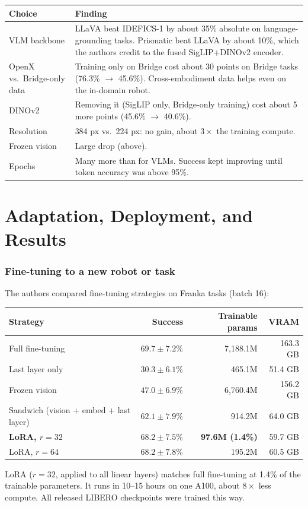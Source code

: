 \documentclass[11pt]{article}
\begin{document}
\begin{center}
\begin{tabularx}{\linewidth}{@{}lX@{}}
\toprule
Choice & Finding \\
\midrule
VLM backbone & LLaVA beat IDEFICS-1 by about 35\% absolute on language-grounding tasks. Prismatic beat LLaVA by about 10\%, which the authors credit to the fused SigLIP+DINOv2 encoder. \\
OpenX vs.\ Bridge-only data & Training only on Bridge cost about 30 points on Bridge tasks (76.3\% $\to$ 45.6\%). Cross-embodiment data helps even on the in-domain robot. \\
DINOv2 & Removing it (SigLIP only, Bridge-only training) cost about 5 more points (45.6\% $\to$ 40.6\%). \\
Resolution & 384 px vs.\ 224 px: no gain, about $3\times$ the training compute. \\
Frozen vision & Large drop (above). \\
Epochs & Many more than for VLMs. Success kept improving until token accuracy was above 95\%. \\
\bottomrule
\end{tabularx}
\end{center}

\part{Adaptation, Deployment, and Results}

\section{Fine-tuning to a new robot or task}

The authors compared fine-tuning strategies on Franka tasks (batch 16):
\begin{center}
\begin{tabular}{@{}lrrr@{}}
\toprule
Strategy & Success & Trainable params & VRAM \\
\midrule
Full fine-tuning & $69.7\pm7.2\%$ & 7{,}188.1M & 163.3 GB \\
Last layer only & $30.3\pm6.1\%$ & 465.1M & 51.4 GB \\
Frozen vision & $47.0\pm6.9\%$ & 6{,}760.4M & 156.2 GB \\
Sandwich (vision + embed + last layer) & $62.1\pm7.9\%$ & 914.2M & 64.0 GB \\
\textbf{LoRA, $r=32$} & $\mathbf{68.2\pm7.5\%}$ & \textbf{97.6M (1.4\%)} & 59.7 GB \\
LoRA, $r=64$ & $68.2\pm7.8\%$ & 195.2M & 60.5 GB \\
\bottomrule
\end{tabular}
\end{center}
LoRA ($r=32$, applied to all linear layers) matches full fine-tuning at 1.4\% of the trainable parameters. It runs in 10--15 hours on one A100, about $8\times$ less compute. All released LIBERO checkpoints were trained this way.
\end{document}
